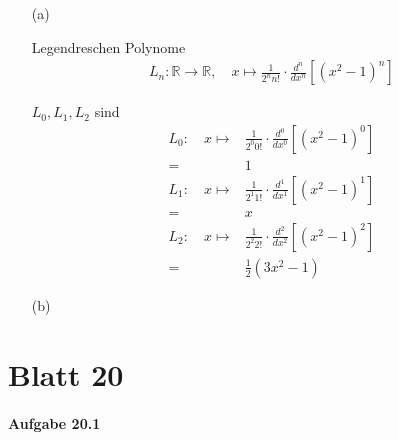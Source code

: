 \documentclass[11pt,a4paper]{article}
\begin{document}
\begin{enumerate}

\item[(a)]

Legendreschen Polynome
\begin{align*}
L_n:\mathbb{R}\rightarrow\mathbb{R},
\hspace{1em}
x\mapsto\frac{1}{2^n n!}\cdot\frac{d^n}{dx^n}[(x^2-1)^n]
\end{align*}

$L_0,L_1,L_2$ sind
\begin{align*}
L_0:\hspace{1em}
x\mapsto &\frac{1}{2^0 0!}\cdot\frac{d^0}{dx^0}[(x^2-1)^0] \\
=&1 \\
L_1:\hspace{1em}
x\mapsto &\frac{1}{2^1 1!}\cdot\frac{d^1}{dx^1}[(x^2-1)^1] \\
=&x \\
L_2:\hspace{1em}
x\mapsto &\frac{1}{2^2 2!}\cdot\frac{d^2}{dx^2}[(x^2-1)^2] \\
=&\frac{1}{2}(3x^2-1)
\end{align*}

\item[(b)]


\end{enumerate}

\newpage

\section*{Blatt 20}

\paragraph{Aufgabe 20.1}
\end{document}
